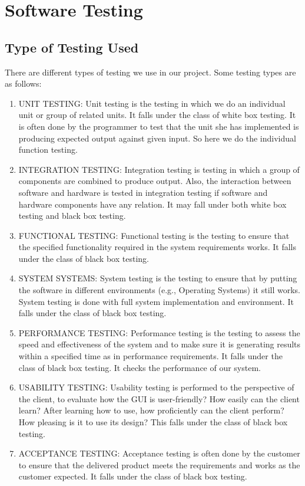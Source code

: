 \documentclass[oneside,a4paper,12pt]{book}
\begin{document}
  
\chapter{Software Testing}
 \section{Type of Testing Used}
   There are diﬀerent types of testing we use in our project. Some testing types are as follows:
   \begin{enumerate}[1.]
  \item	UNIT TESTING: 
Unit testing is the testing in which we do an individual unit or group of related units. It falls under the class of white box testing. It is often done by the programmer to test that the unit she has implemented is producing expected output against given input. So here we do the individual function testing.

\item	INTEGRATION TESTING: 
Integration testing is testing in which a group of components are combined to produce output. Also, the interaction between software and hardware is tested in integration testing if software and hardware components have any relation. It may fall under both white box testing and black box testing.

\item	FUNCTIONAL TESTING: 
Functional testing is the testing to ensure that the speciﬁed functionality required in the system requirements works. It falls under the class of black box testing.

\item	SYSTEM SYSTEMS: 
System testing is the testing to ensure that by putting the software in diﬀerent environments (e.g., Operating Systems) it still works. System testing is done with full system implementation and environment. It falls under the class of black box testing.

\item	PERFORMANCE TESTING: 
Performance testing is the testing to assess the speed and eﬀectiveness of the system and to make sure it is generating results within a speciﬁed time as in performance requirements. It falls under the class of black box testing. It checks the performance of our system.

\item	USABILITY TESTING: 
Usability testing is performed to the perspective of the client, to evaluate how the GUI is user-friendly? How easily can the client learn? After learning how to use, how proﬁciently can the client perform? How pleasing is it to use its design? This falls under the class of black box testing.

\item	ACCEPTANCE TESTING: 
Acceptance testing is often done by the customer to ensure that the delivered product meets the requirements and works as the customer expected. It falls under the class of black box testing.
   \end{enumerate}
\end{document}
